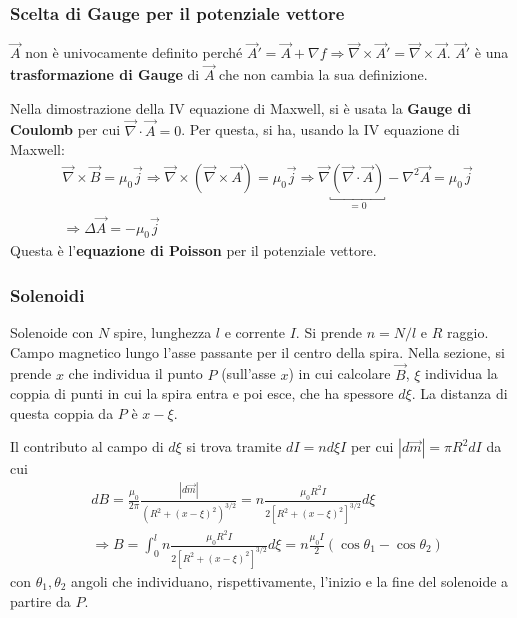 \documentclass[a4paper]{scrartcl}
\numberwithin{equation}{subsection}
\theoremstyle{style1}
\begin{document}
\subsubsection{Scelta di Gauge per il potenziale vettore}
$\vec{A}$ non \`e univocamente definito perch\'e $\vec{A}' = \vec{A} + \nabla f \Rightarrow \vec{\nabla } \times \vec{A}' = \vec{\nabla }\times \vec{A}$. $\vec{A}'$ \`e una \textbf{trasformazione di Gauge} di $\vec{A}$ che non cambia la sua definizione. 

Nella dimostrazione della IV equazione di Maxwell, si \`e usata la \textbf{Gauge di Coulomb} per cui $\vec{\nabla }\cdot \vec{A} = 0$. Per questa, si ha, usando la IV equazione di Maxwell:
\begin{equation}
	\begin{split}
		&\vec{\nabla }\times \vec{B} =  \mu_0 \vec{j} \Rightarrow \vec{\nabla }\times  (\vec{\nabla }\times \vec{A}) = \mu_0 \vec{j} \Rightarrow \vec{\nabla }\underbracket{(\vec{\nabla }\cdot \vec{A})}_{=0}  - \nabla ^2 \vec{A} = \mu_0 \vec{j}\\
		&\Rightarrow \Delta \vec{A} = - \mu_0 \vec{j}
	\end{split}
\end{equation}
Questa \`e l'\textbf{equazione di Poisson} per il potenziale vettore. 
\subsubsection{Solenoidi}
Solenoide con $N$ spire, lunghezza $l$ e corrente $I$. Si prende $n = N / l$ e $R$ raggio. Campo magnetico lungo l'asse passante per il centro della spira. Nella sezione, si prende $x$ che individua il punto $P$ (sull'asse $x$) in cui calcolare $\vec{B}$, $\xi $ individua la coppia di punti in cui la spira entra e poi esce, che ha spessore $d\xi $. La distanza di questa coppia da $P$ \`e $x-\xi $.

Il contributo al campo di $d\xi $ si trova tramite $dI = n d\xi  I$ per cui $\left\lvert d\vec{m} \right\rvert = \pi R^2 dI$ da cui
\begin{equation}
	\begin{split}
		&dB  = \frac{\mu_0}{2\pi}\frac{\left\lvert d\vec{m} \right\rvert }{(R^2 + (x-\xi )^2)^{3 / 2} }=n \frac{\mu_0 R^2 I}{2 \left[ R^2 + (x-\xi )^2 \right] ^{3 / 2} } d\xi \\
		&\Rightarrow B = \int_{0} ^l n \frac{\mu_0 R^2 I }{2 \left[ R^2 + (x-\xi )^2 \right] ^{3 / 2} } d\xi = n \frac{\mu_0 I}{2}(\cos \theta_1 - \cos \theta_2)
	\end{split}
\end{equation}
con $\theta_1, \theta_2$ angoli che individuano, rispettivamente, l'inizio e la fine del solenoide a partire da $P$.
\end{document}
